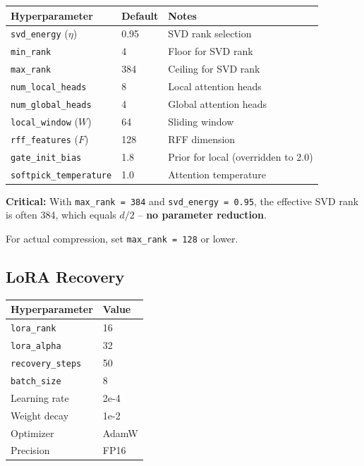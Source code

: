\begin{table}[H]
\centering
\small
\begin{tabular}{lll}
\toprule
\textbf{Hyperparameter} & \textbf{Default} & \textbf{Notes} \\
\midrule
\texttt{svd\_energy} ($\eta$) & 0.95 & SVD rank selection \\
\texttt{min\_rank} & 4 & Floor for SVD rank \\
\texttt{max\_rank} & 384 & Ceiling for SVD rank \\
\texttt{num\_local\_heads} & 8 & Local attention heads \\
\texttt{num\_global\_heads} & 4 & Global attention heads \\
\texttt{local\_window} ($W$) & 64 & Sliding window \\
\texttt{rff\_features} ($F$) & 128 & RFF dimension \\
\texttt{gate\_init\_bias} & 1.8 & Prior for local (overridden to 2.0) \\
\texttt{softpick\_temperature} & 1.0 & Attention temperature \\
\bottomrule
\end{tabular}
\end{table}

\textbf{Critical:} With \texttt{max\_rank = 384} and \texttt{svd\_energy = 0.95}, the effective 
SVD rank is often 384, which equals $d/2$ -- \textbf{no parameter reduction}.

For actual compression, set \texttt{max\_rank = 128} or lower.

\subsection{LoRA Recovery}

\begin{table}[H]
\centering
\small
\begin{tabular}{ll}
\toprule
\textbf{Hyperparameter} & \textbf{Value} \\
\midrule
\texttt{lora\_rank} & 16 \\
\texttt{lora\_alpha} & 32 \\
\texttt{recovery\_steps} & 50 \\
\texttt{batch\_size} & 8 \\
Learning rate & 2e-4 \\
Weight decay & 1e-2 \\
Optimizer & AdamW \\
Precision & FP16 \\
\bottomrule
\end{tabular}
\end{table}

